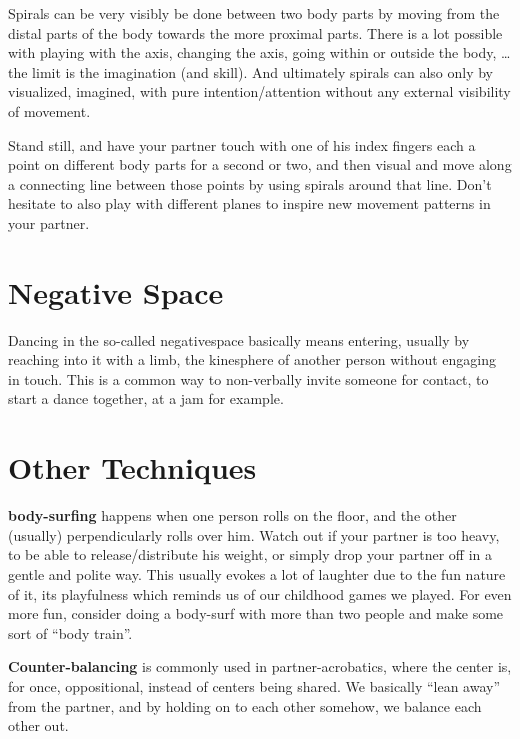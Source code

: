 Spirals can be very visibly be done between two body parts by moving from the distal parts of the body towards the more proximal parts.
There is a lot possible with playing with the axis, changing the axis, going within or outside the body, \ldots the limit is the imagination (and skill).
And ultimately spirals can also only by visualized, imagined, with pure intention/attention without any external visibility of movement.

\begin{exercise}
    Stand still, and have your partner touch with one of his index fingers each a point on different body parts for a second or two, and then visual and move along a connecting line between those points by using spirals around that line.
    Don't hesitate to also play with different planes to inspire new movement patterns in your partner.
\end{exercise}

\section{Negative Space}\label{sec:negative-space}

Dancing in the so-called \gls{negativespace} basically means entering, usually by reaching into it with a limb, the \gls{kinesphere} of another person without engaging in touch.
This is a common way to non-verbally invite someone for contact, to start a dance together, at a jam for example.

\section{Other Techniques}\label{sec:other-techniques}

\textbf{\Gls{body-surfing}} happens when one person rolls on the floor, and the other (usually) perpendicularly rolls over him.
Watch out if your partner is too heavy, to be able to release/distribute his weight, or simply drop your partner off in a gentle and polite way.
This usually evokes a lot of laughter due to the fun nature of it, its playfulness which reminds us of our childhood games we played.
For even more fun, consider doing a body-surf with more than two people and make some sort of ``body train''.

\textbf{Counter-balancing} is commonly used in partner-acrobatics, where the center is, for once, oppositional, instead of centers being shared.
We basically ``lean away'' from the partner, and by holding on to each other somehow, we balance each other out.
